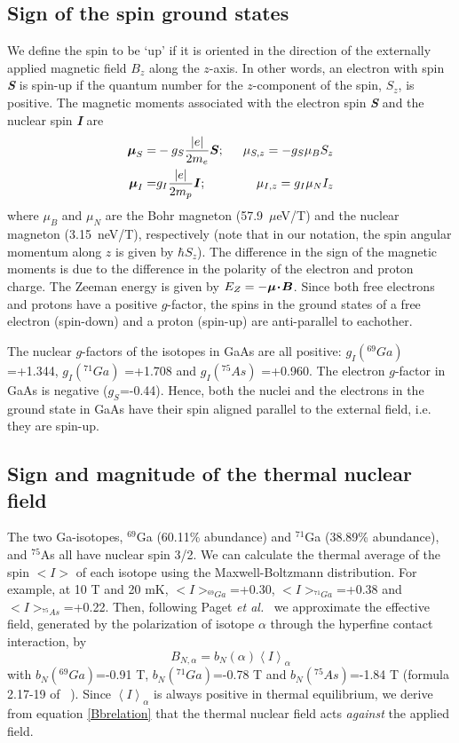\documentclass[12pt,aps,nofootinbib]{revtex4-1}
\begin{document}
\subsection{Sign of the spin ground states}
We define the spin to be `up' if it is oriented in the direction
of the externally applied magnetic field $B_z$ along the $z$-axis.
In other words, an electron with spin \textbf{\textit{S}} is
spin-up if the quantum number for the $z$-component of the spin, $S_z$, is positive. The
magnetic moments associated with the electron spin
\textbf{\textit{S}} and the nuclear spin \textbf{\textit{I}} are
\begin{eqnarray}
     \mbox{\boldmath$\mu$}_S =& -g_S \frac{|e|}{2m_e}\mbox{\boldmath$S$};\ \  &\mu_{S,z} = -g_S \mu_B S_z\\
     \mbox{\boldmath$\mu$}_I =& g_I \frac{|e| }{2m_p}\mbox{\boldmath$I$};\ \  &\mu_{I,z} = g_I \mu_N I_z
\end{eqnarray}
where $\mu_B$ and $\mu_N$ are the Bohr magneton (57.9~$\mu$eV/T)
and the nuclear magneton (3.15~neV/T), respectively (note that in our notation, the spin angular momentum along $z$ is given by $\hbar S_z$). The difference in the 
sign of the magnetic moments is due to the difference in the
polarity of the electron and proton charge. The Zeeman energy is
given by $E_{Z}=-\mbox{\boldmath$\mu\!\cdot\! B$}$. Since both
free electrons and protons have a positive $g$-factor, the spins
in the ground states of a free electron (spin-down) and a proton
(spin-up) are anti-parallel to eachother.

The nuclear $g$-factors of the isotopes in GaAs are all positive:
$g_I(^{69}Ga)$ =+1.344, $g_I(^{71}Ga)\!$  =+1.708 and
$g_I(^{75}As)\!$ =+0.960. The electron $g$-factor in GaAs is
negative ($g_S$=-0.44). Hence, both the nuclei and the electrons
in the ground state in GaAs have their spin aligned parallel to
the external field, i.e. they are spin-up.

\subsection{Sign and magnitude of the thermal nuclear field}
The two Ga-isotopes, $^{69}$Ga (60.11\% abundance) and $^{71}$Ga
(38.89\% abundance), and $^{75}$As all have nuclear spin 3/2. We
can calculate the thermal average of the spin $<\!\!I\!\!>$ of
each isotope using the Maxwell-Boltzmann distribution. For
example, at 10 T and 20 mK, $<\!\!I\!\!>_{^{69}Ga}$=+0.30,
$<\!\!I\!\!>_{^{71}Ga}$=+0.38 and $<\!\!I\!\!>_{^{75}As}$=+0.22.
Then, following Paget \textit{et al.}~\cite{paget77} we
approximate the effective field, generated by the polarization of
isotope $\alpha$ through the hyperfine contact interaction, by
\begin{equation}
    B_{N,\alpha}=b_N(\alpha)\left\langle I\right\rangle_\alpha
    \label{Bbrelation}
\end{equation}
with $b_N(^{69}Ga)$=-0.91 T, $b_N(^{71}Ga)$=-0.78 T and $b_N(^{75}As)$=-1.84 T (formula 2.17-19 of ~\textcite{paget77}). Since $\left\langle I\right\rangle_\alpha$ is always positive in thermal equilibrium, we derive from equation \ref{Bbrelation} that the thermal nuclear field acts \textit{against} the applied field. 
\end{document}
